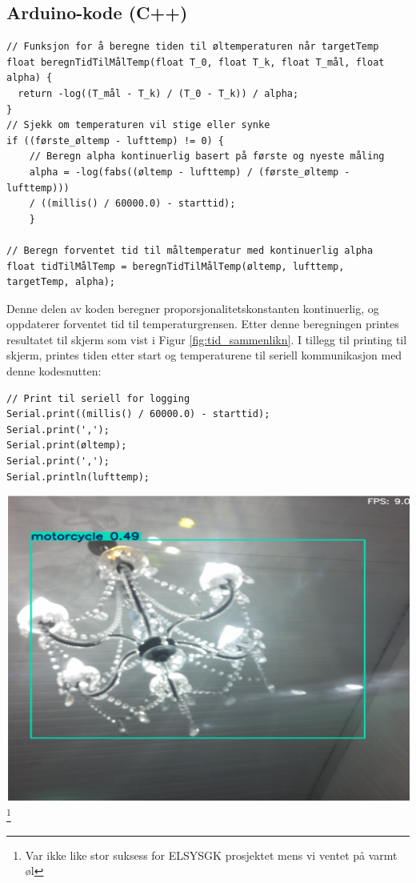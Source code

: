\documentclass{article}
\begin{document}
\subsection{Arduino-kode (C++)}
\label{C++}
\begin{verbatim}
// Funksjon for å beregne tiden til øltemperaturen når targetTemp
float beregnTidTilMålTemp(float T_0, float T_k, float T_mål, float alpha) {
  return -log((T_mål - T_k) / (T_0 - T_k)) / alpha;
}
// Sjekk om temperaturen vil stige eller synke
if ((første_øltemp - lufttemp) != 0) {
    // Beregn alpha kontinuerlig basert på første og nyeste måling
    alpha = -log(fabs((øltemp - lufttemp) / (første_øltemp - lufttemp))) 
    / ((millis() / 60000.0) - starttid);
    }

// Beregn forventet tid til måltemperatur med kontinuerlig alpha
float tidTilMålTemp = beregnTidTilMålTemp(øltemp, lufttemp, targetTemp, alpha);

\end{verbatim}
Denne delen av koden beregner proporsjonalitetskonstanten kontinuerlig, og oppdaterer forventet tid til temperaturgrensen. Etter denne beregningen printes resultatet til skjerm som vist i Figur \ref{fig:tid_sammenlikn}.
I tillegg til printing til skjerm, printes tiden etter start og temperaturene til seriell kommunikasjon med denne kodesnutten:
\begin{verbatim}
// Print til seriell for logging
Serial.print((millis() / 60000.0) - starttid);
Serial.print(',');
Serial.print(øltemp);
Serial.print(',');
Serial.println(lufttemp);
\end{verbatim}
\begin{center}
    \includegraphics[width=0.8\linewidth]{motorcycle.png}\footnote{Var ikke like stor suksess for ELSYSGK prosjektet mens vi ventet på varmt øl}
\end{center}
\vfill
\end{document}

